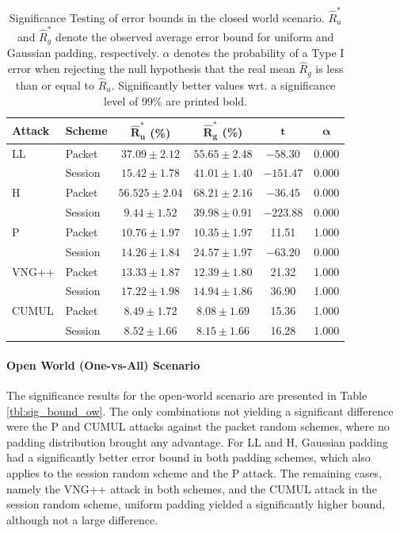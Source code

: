 \documentclass[
	ruledheaders=chapter,
	class=report,
	thesis={type=master, department=inf},
	accentcolor=1c,
	custommargins=true,
	marginpar=false,
	parskip=half-,
	fontsize=11pt,
]{tudapub}
\begin{document}
	\begin{table}
		\centering
		\small
		\begin{tabular}{llcccc}
			\toprule \textbf{Attack} & \textbf{Scheme} & $\mathbf{\widehat{R}^*_u}$ \textbf{(\%)} & $\mathbf{\widehat{R}^*_g}$  \textbf{(\%)} & $\mathbf{t}$ & $\mathbf{\alpha}$ \\
			\midrule LL & Packet & $37.09 \pm 2.12$ & $\mathbf{55.65 \pm 2.48}$ & $-58.30$ & 0.000\\
			& Session & $15.42 \pm 1.78$ & $\mathbf{41.01 \pm 1.40}$ & $-151.47$ &  0.000\\ \addlinespace
			H & Packet & $56.525 \pm 2.04$ & $\mathbf{68.21 \pm 2.16}$ & $-36.45$ & 0.000 \\
			& Session & $9.44 \pm 1.52$ & $\mathbf{39.98 \pm 0.91}$ & $-223.88$ & 0.000 \\ \addlinespace
			P & Packet & $\mathbf{10.76 \pm 1.97}$ & $10.35 \pm 1.97$ & 11.51 & 1.000 \\
			& Session & $14.26 \pm 1.84$ & $\mathbf{24.57 \pm 1.97}$ & $-63.20$ & 0.000 \\ \addlinespace
			VNG++ & Packet & $\mathbf{13.33 \pm 1.87}$ & $12.39 \pm 1.80$ & 21.32 & 1.000 \\
			& Session & $\mathbf{17.22 \pm 1.98}$ & $14.94 \pm 1.86$ & 36.90 & 1.000 \\ \addlinespace
			CUMUL & Packet & $\mathbf{8.49\pm 1.72}$ & $8.08 \pm 1.69$ & 15.36 & 1.000\\
			& Session & $\mathbf{8.52 \pm 1.66}$ & $8.15 \pm 1.66$ & 16.28 & 1.000 \\
			\bottomrule
		\end{tabular}
		\caption[Significance Testing of error bounds in the closed world scenario]{Significance Testing of error bounds in the closed world scenario. $\widehat{R}^*_u$ and $\widehat{R}^*_g$ denote the observed average error bound for uniform and Gaussian padding, respectively. $\alpha$ denotes the probability of a Type I error when rejecting the null hypothesis that the real mean $\widehat{R}_g$ is less than or equal to $\widehat{R}_u$. Significantly better values wrt. a significance level of 99\% are printed bold. }
		\label{tbl:sig_bound_cw}
	\end{table}

	\paragraph{Open World (One-vs-All) Scenario} The significance results for the open-world scenario are presented in Table \ref{tbl:sig_bound_ow}. The only combinations not yielding a significant difference were the P and CUMUL attacks against the packet random schemes, where no padding distribution brought any advantage. For LL and H, Gaussian padding had a significantly better error bound in both padding schemes, which also applies to the session random scheme and the P attack. The remaining cases, namely the VNG++ attack in both schemes, and the CUMUL attack in the session random scheme, uniform padding yielded a significantly higher bound, although not a large difference.
	
\end{document}
